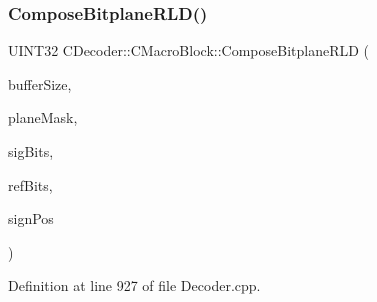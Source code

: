 \subsubsection{\texorpdfstring{ComposeBitplaneRLD()}{ComposeBitplaneRLD()}\hspace{0.1cm}{\footnotesize\ttfamily [2/2]}}
{\footnotesize\ttfamily U\+I\+N\+T32 C\+Decoder\+::\+C\+Macro\+Block\+::\+Compose\+Bitplane\+R\+LD (\begin{DoxyParamCaption}\item[{U\+I\+N\+T32}]{buffer\+Size,  }\item[{\mbox{\hyperlink{PGFtypes_8h_acb1ee3f52ccfad782dcaa0abd79e5d05}{DataT}}}]{plane\+Mask,  }\item[{U\+I\+N\+T32 $\ast$}]{sig\+Bits,  }\item[{U\+I\+N\+T32 $\ast$}]{ref\+Bits,  }\item[{U\+I\+N\+T32}]{sign\+Pos }\end{DoxyParamCaption})\hspace{0.3cm}{\ttfamily [private]}}



Definition at line 927 of file Decoder.\+cpp.


